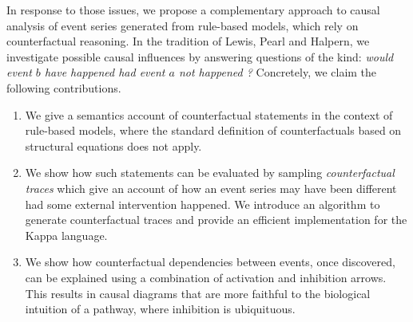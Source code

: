 In response to those issues, we propose a complementary approach to
causal analysis of event series generated from rule-based models,
which rely on {counterfactual reasoning}. In the tradition of Lewis,
Pearl and Halpern, we investigate possible causal influences by
answering questions of the kind: \textit{would event $b$ have happened
  had event $a$ not happened ?}
Concretely, we claim the following contributions.
\begin{enumerate}
\item We give a semantics account of counterfactual statements in the
  context of rule-based models, where the standard definition of
  counterfactuals based on structural equations
  \cite{pearl2009causality} does not apply.
\item We show how such statements can be evaluated by sampling
  \emph{counterfactual traces} which give an account of how an event
  series may have been different had some external intervention
  happened. We introduce an algorithm to generate counterfactual
  traces and provide an efficient implementation for the Kappa
  language.
\item We show how counterfactual dependencies between events, once
  discovered, can be explained using a combination of activation and
  inhibition arrows. This results in causal diagrams that are more
  faithful to the biological intuition of a pathway, where inhibition
  is ubiquituous.
\end{enumerate}
